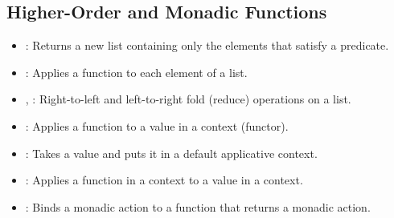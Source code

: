 \subsection{Higher-Order and Monadic Functions}
\begin{itemize}
    \item {}: Returns a new list containing only the elements that satisfy a predicate.
    \item {}: Applies a function to each element of a list.
    \item {}, : Right-to-left and left-to-right fold (reduce) operations on a list.
    \item {}: Applies a function to a value in a context (functor).
    \item {}: Takes a value and puts it in a default applicative context.
    \item \code{<*>}: Applies a function in a context to a value in a context.
    \item \code{>>=}: Binds a monadic action to a function that returns a monadic action.
\end{itemize}

